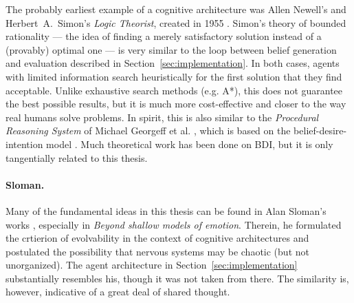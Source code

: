 The probably earliest example of a cognitive architecture was Allen Newell's and Herbert~A.~Simon's {\em Logic Theorist}, created in 1955 \cite[p.\ 44]{crevier93}. Simon's theory of bounded rationality \cite{Gigerenzer2001} --- the idea of finding a merely satisfactory solution instead of a (provably) optimal one --- is very similar to the loop between belief generation and evaluation described in Section~\ref{sec:implementation}. In both cases, agents with limited information search heuristically for the first solution that they find acceptable. Unlike exhaustive search methods (e.g. A*), this does not guarantee the best possible results, but it is much more cost-effective and closer to the way real humans solve problems. In spirit, this is also similar to the {\em Procedural Reasoning System} of Michael Georgeff et al. \cite{pcs}, which is based on the belief-desire-intention model \cite{Rao95bdiagents, Bratman87}. Much theoretical work has been done on BDI, but it is only tangentially related to this thesis.

\paragraph{Sloman.} Many of the fundamental ideas in this thesis can be found in Alan Sloman's works \cite{sloman1993, sloman1997, sloman1999, sloman2000, slomanSimAgent}, especially in {\em Beyond shallow models of emotion}. Therein, he formulated the crtierion of evolvability in the context of cognitive architectures and postulated the possibility that nervous systems may be chaotic (but not unorganized). The agent architecture in Section~\ref{sec:implementation} substantially resembles his, though it was not taken from there. The similarity is, however, indicative of a great deal of shared thought.

